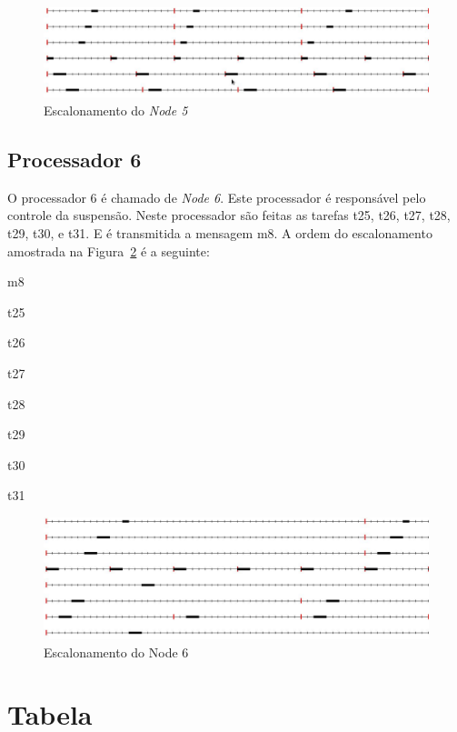 \documentclass[12pt]{article}
\begin{document}
\begin{figure}[ht]
	\centering
	\includegraphics[width=1\textwidth]{node5.jpg}
    \caption{Escalonamento do \textit{Node 5}}
	\label{node5}
\end{figure}

\subsection{Processador 6}

O processador 6 é chamado de \textit{Node 6}. Este processador é responsável pelo controle da suspensão. Neste processador são feitas as tarefas t25, t26, t27, t28, t29, t30, e t31. E é transmitida a mensagem m8. 
A ordem do escalonamento amostrada na Figura~\ref{node6} é a seguinte:

\begin{enumerate}
    \begin{horizlist}{3}{1cm}
    \item m8
    \item t25
    \item t26
    \item t27
    \item t28
    \item t29
    \item t30
    \item t31
    \end{horizlist}
\end{enumerate}

\begin{figure}[ht]
	\centering
	\includegraphics[width=1\textwidth]{node6.jpg}
    \caption{Escalonamento do Node 6}
	\label{node6}
\end{figure}

\section{Tabela}
\end{document}
